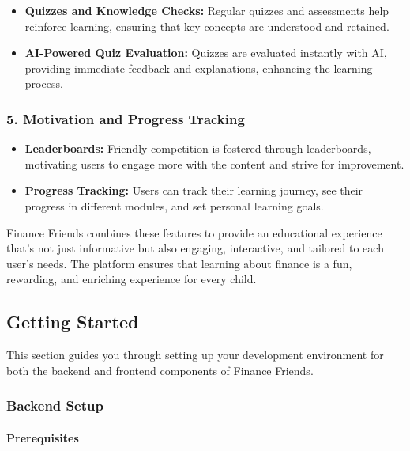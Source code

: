 \begin{itemize}
\tightlist
\item
  \textbf{Quizzes and Knowledge Checks:} Regular quizzes and assessments
  help reinforce learning, ensuring that key concepts are understood and
  retained.
\item
  \textbf{AI-Powered Quiz Evaluation:} Quizzes are evaluated instantly
  with AI, providing immediate feedback and explanations, enhancing the
  learning process.
\end{itemize}

\hypertarget{motivation-and-progress-tracking}{%
\subsubsection{5. Motivation and Progress
Tracking}\label{motivation-and-progress-tracking}}

\begin{itemize}
\tightlist
\item
  \textbf{Leaderboards:} Friendly competition is fostered through
  leaderboards, motivating users to engage more with the content and
  strive for improvement.
\item
  \textbf{Progress Tracking:} Users can track their learning journey,
  see their progress in different modules, and set personal learning
  goals.
\end{itemize}

Finance Friends combines these features to provide an educational
experience that's not just informative but also engaging, interactive,
and tailored to each user's needs. The platform ensures that learning
about finance is a fun, rewarding, and enriching experience for every
child.

\hypertarget{getting-started}{%
\subsection{Getting Started}\label{getting-started}}

This section guides you through setting up your development environment
for both the backend and frontend components of Finance Friends.

\hypertarget{backend-setup}{%
\subsubsection{Backend Setup}\label{backend-setup}}

\hypertarget{prerequisites}{%
\paragraph{Prerequisites}\label{prerequisites}}

